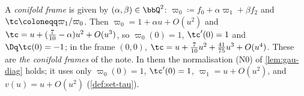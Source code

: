 
\begin{defn}
\label{def:set-frames}
A \emph{conifold frame} is given by $(\alpha,\beta)\in\bbQ^2$: $\varpi_0\coloneqq f_0+\alpha\varpi_1+\beta f_2$ and $\tc\coloneqq\varpi_1/\varpi_0$. Then $\varpi_0=1+\alpha u+O(u^2)$ and $\tc=u+(\frac7{10}-\alpha)u^2+O(u^3)$, so $\varpi_0(0)=1$, $\tc'(0)=1$ and $\Dq\tc(0)=-1$; in the frame $(0,0)$, $\tc=u+\frac7{10}u^2+\frac{41}{75}u^3+O(u^4)$. These are \emph{the conifold frames} of the note. In them the normalisation (N0) of \cref{lem:gau-diag} holds; it uses only $\varpi_0(0)=1$, $\tc'(0)=1$, $\varpi_1=u+O(u^2)$, and $v(u)=u+O(u^2)$ (\cref{def:set-tau}).
\end{defn}

